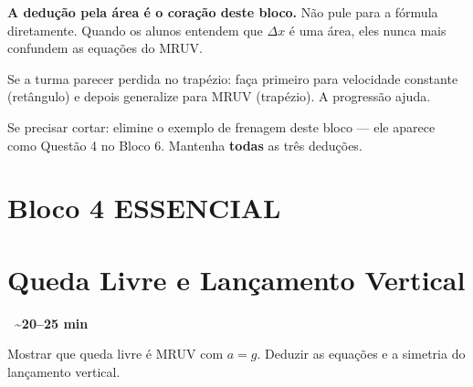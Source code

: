 \documentclass[12pt,a4paper]{article}
\newcommand{\tempo}[1]{%
  \begin{flushright}
    \colorbox{azulphysics!20}{\small\textbf{\faClock\ \textasciitilde{}#1 min}}
  \end{flushright}\vspace{-0.5em}
}
\begin{document}
\begin{tcolorbox}[dicabox]
  \textbf{A dedu\c{c}\~ao pela \'area \'e o coração deste bloco.}
  N\~ao pule para a f\'ormula diretamente. Quando os alunos entendem
  que $\Delta x$ \'e uma \'area, eles nunca mais confundem as equa\c{c}\~oes
  do MRUV.

  \medskip
  Se a turma parecer perdida no trap\'ezio: fa\c{c}a primeiro para
  velocidade constante (ret\^angulo) e depois generalize para MRUV
  (trap\'ezio). A progress\~ao ajuda.
\end{tcolorbox}

\begin{tcolorbox}[cortebox]
  Se precisar cortar: elimine o exemplo de frenagem deste bloco ---
  ele aparece como Quest\~ao 4 no Bloco 6.
  Mantenha \textbf{todas} as tr\^es dedu\c{c}\~oes.
\end{tcolorbox}

\newpage

\section*{Bloco 4 \hfill\colorbox{verdeok!30}{\small ESSENCIAL}}
\section*{\hspace{1.2em}Queda Livre e Lan\c{c}amento Vertical}
\tempo{20--25}

\begin{tcolorbox}[blocobox={Objetivos}]
  Mostrar que queda livre \'e MRUV com $a = g$.
  Deduzir as equa\c{c}\~oes e a simetria do lan\c{c}amento vertical.
\end{tcolorbox}
\end{document}
